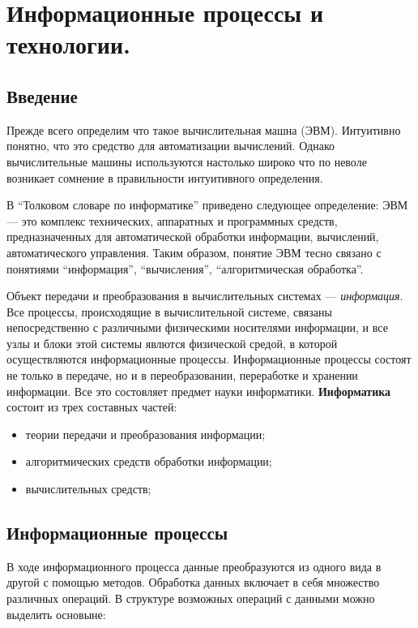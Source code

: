 \documentclass[a4paper]{article}
\begin{document}
\section{Информационные процессы и технологии.}

\subsection{Введение}

Прежде всего определим что такое вычислительная машна (ЭВМ). Интуитивно понятно, что это средство для автоматизации вычислений. Однако вычислительные машины используются настолько широко что по неволе возникает сомнение в правильности интуитивного определения.

В ``Толковом словаре по информатике'' приведено следующее определение: ЭВМ --- это комплекс технических, аппаратных и программных средств, предназначенных для автоматической обработки информации, вычислений, автоматического управления. Таким образом, понятие ЭВМ тесно связано с понятиями ``информация'', ``вычисления'', ``алгоритмическая обработка''.

Объект передачи и преобразования в вычислительных системах --- \textit{информация}. Все процессы, происходящие в вычислительной системе, связаны непосредственно с различными физическими носителями информации, и все узлы и блоки этой системы явлются физической средой, в которой осуществляются информационные процессы. Информационные процессы состоят не только в передаче, но и в переобразовании, переработке и хранении информации. Все это состовляет предмет науки информатики. \textbf{Информатика} состоит из трех составных частей:
\begin{itemize}
  \item теории передачи и преобразования информации;
  \item алгоритмических средств обработки информации;
  \item вычислительных средств;
\end{itemize}

\subsection{Информационные процессы}

В ходе информационного процесса данные преобразуются из одного вида в другой с помощью методов. Обработка данных включает в себя множество различных операций. В структуре возможных операций с данными можно выделить основыне:
\end{document}
